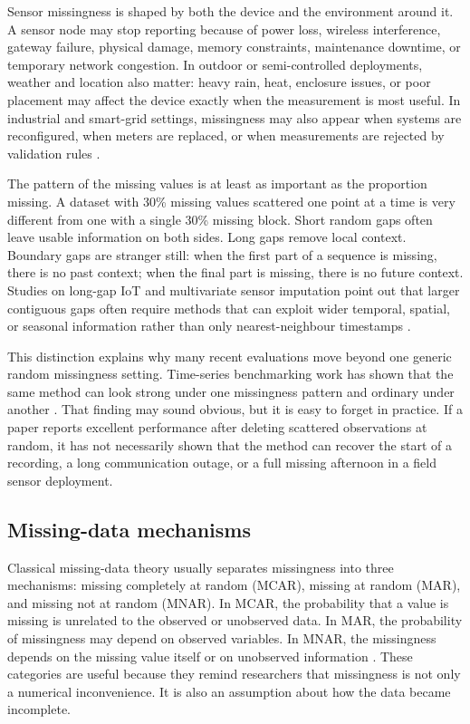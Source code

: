 Sensor missingness is shaped by both the device and the environment around it. A sensor node may stop reporting because of power loss, wireless interference, gateway failure, physical damage, memory constraints, maintenance downtime, or temporary network congestion. In outdoor or semi-controlled deployments, weather and location also matter: heavy rain, heat, enclosure issues, or poor placement may affect the device exactly when the measurement is most useful. In industrial and smart-grid settings, missingness may also appear when systems are reconfigured, when meters are replaced, or when measurements are rejected by validation rules \cite{Schreiber2023DataIT,Wu2022DataIF}.

The pattern of the missing values is at least as important as the proportion missing. A dataset with 30\% missing values scattered one point at a time is very different from one with a single 30\% missing block. Short random gaps often leave usable information on both sides. Long gaps remove local context. Boundary gaps are stranger still: when the first part of a sequence is missing, there is no past context; when the final part is missing, there is no future context. Studies on long-gap IoT and multivariate sensor imputation point out that larger contiguous gaps often require methods that can exploit wider temporal, spatial, or seasonal information rather than only nearest-neighbour timestamps \cite{Ahmed2022LongGM,Wu2022DataIF,Liu2020}.

This distinction explains why many recent evaluations move beyond one generic random missingness setting. Time-series benchmarking work has shown that the same method can look strong under one missingness pattern and ordinary under another \cite{Toye2025BenchmarkingMD}. That finding may sound obvious, but it is easy to forget in practice. If a paper reports excellent performance after deleting scattered observations at random, it has not necessarily shown that the method can recover the start of a recording, a long communication outage, or a full missing afternoon in a field sensor deployment.

\subsection{Missing-data mechanisms}

Classical missing-data theory usually separates missingness into three mechanisms: missing completely at random (MCAR), missing at random (MAR), and missing not at random (MNAR). In MCAR, the probability that a value is missing is unrelated to the observed or unobserved data. In MAR, the probability of missingness may depend on observed variables. In MNAR, the missingness depends on the missing value itself or on unobserved information \cite{Little2019,Jamshidian2014,Pham2022}. These categories are useful because they remind researchers that missingness is not only a numerical inconvenience. It is also an assumption about how the data became incomplete.

